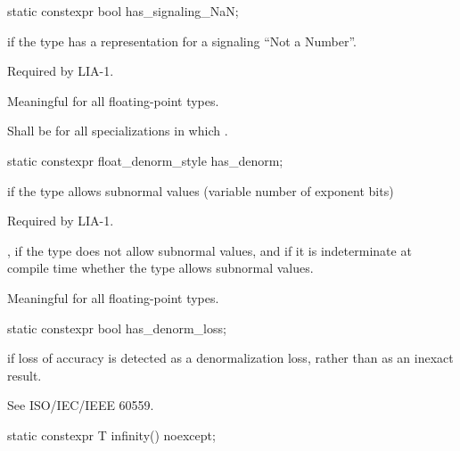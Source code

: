 %
\begin{itemdecl}
static constexpr bool has_signaling_NaN;
\end{itemdecl}

\begin{itemdescr}
\pnum
{} if the type has a representation for a signaling ``Not a Number''.
\begin{footnote}
Required by LIA-1.
\end{footnote}

\pnum
Meaningful for all floating-point types.

\pnum
Shall be
for all specializations in which
.
\end{itemdescr}

%
\begin{itemdecl}
static constexpr float_denorm_style has_denorm;
\end{itemdecl}

%
\begin{itemdescr}
\pnum
{}
if the type allows subnormal values
(variable number of exponent bits)
\begin{footnote}
Required by LIA-1.
\end{footnote},
if the type does not allow subnormal values,
and
if it is indeterminate at compile time whether the type allows
subnormal values.

\pnum
Meaningful for all floating-point types.
\end{itemdescr}

%
\begin{itemdecl}
static constexpr bool has_denorm_loss;
\end{itemdecl}

\begin{itemdescr}
\pnum
{} if loss of accuracy is detected as a
denormalization loss, rather than as an inexact result.
\begin{footnote}
See
ISO/IEC/IEEE 60559.
\end{footnote}
\end{itemdescr}

%
\begin{itemdecl}
static constexpr T infinity() noexcept;
\end{itemdecl}


